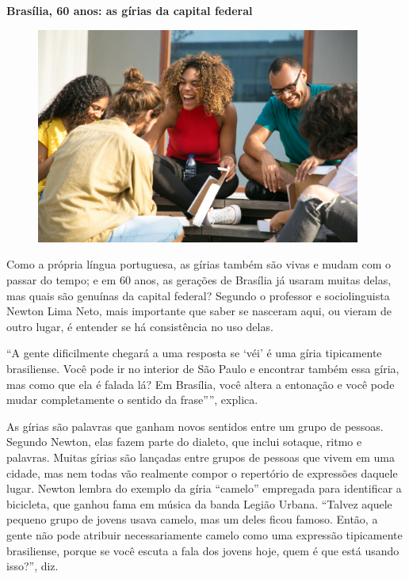 \begin{myquote}

\textbf{Brasília, 60 anos: as gírias da capital federal}

\begin{figure}[H]
\centering
\includegraphics[width=0.95\textwidth]{./imgSAEB_7_POR/media/image58.png}
\end{figure}

Como a própria língua portuguesa, as gírias também são vivas e mudam com o
passar do tempo; e em 60 anos, as gerações de Brasília já usaram muitas delas,
mas quais são genuínas da capital federal? Segundo o professor e
sociolinguista Newton Lima Neto, mais importante que saber se nasceram aqui,
ou vieram de outro lugar, é entender se há consistência no uso delas.

``A gente dificilmente chegará a uma resposta se `véi' é uma gíria tipicamente
brasiliense. Você pode ir no interior de São Paulo e encontrar também essa
gíria, mas como que ela é falada lá? Em Brasília, você altera a entonação e
você pode mudar completamente o sentido da frase''”, explica.

As gírias são palavras que ganham novos sentidos entre um grupo de pessoas.
Segundo Newton, elas fazem parte do dialeto, que inclui sotaque, ritmo e
palavras. Muitas gírias são lançadas entre grupos de pessoas que vivem em uma cidade,
mas nem todas vão realmente compor o repertório de expressões daquele lugar.
Newton lembra do exemplo da gíria ``camelo'' empregada para identificar a
bicicleta, que ganhou fama em música da banda Legião Urbana. ``Talvez aquele
pequeno grupo de jovens usava camelo, mas um deles ficou famoso. Então, a
gente não pode atribuir necessariamente camelo como uma expressão tipicamente
brasiliense, porque se você escuta a fala dos jovens hoje, quem é que está
usando isso?'', diz.


\end{myquote}

